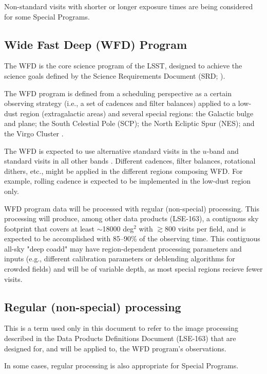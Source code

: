 Non-standard visits with shorter or longer exposure times are being 
considered for some Special Programs.

\subsection{Wide Fast Deep (WFD) Program}

The WFD is the core science program of the LSST, designed to achieve the science 
goals defined by the Science Requirements Document (SRD; ).

The WFD program is defined from a scheduling perspective as a certain observing strategy
(i.e., a set of cadences and filter balances) applied to a low-dust region 
(extragalactic areas) and several special regions:
the Galactic bulge and plane; the South Celestial Pole (SCP); the North Ecliptic Spur (NES);
and the Virgo Cluster .

The WFD is expected to use alternative standard visits in the $u$-band and 
standard visits in all other bands .
Different cadences, filter balances, rotational dithers, etc., might
be applied in the different regions composing WFD.
For example, rolling cadence is expected to be implemented in the low-dust region only.

WFD program data will be processed with regular (non-special) processing.
This processing will produce, among other data products (LSE-163), 
a contiguous sky footprint that covers at 
least $\sim$18000 deg$^2$ with $\gtrsim$800 visits per field, 
and is expected to be accomplished with 85--90\% of the observing time.
This contiguous all-sky "deep coadd" may have region-dependent processing parameters and inputs
(e.g., different calibration parameters or deblending algorithms for crowded fields)
and will be of variable depth, as most special regions recieve fewer visits.

\subsection{Regular (non-special) processing}

This is a term used only in this document to refer to the image processing 
described in the Data Products Definitions Document
(LSE-163) that are designed for, and will be applied to, the WFD program's observations.

In some cases, regular processing is also appropriate for Special Programs.

